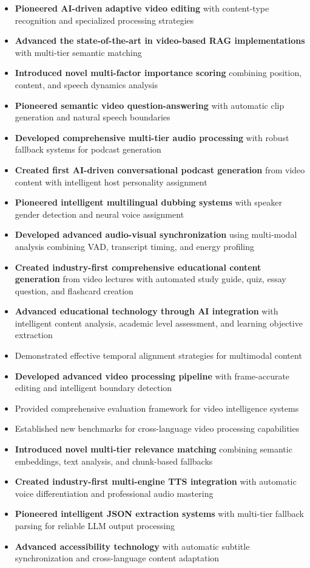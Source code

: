 \documentclass{bscs}
\begin{document}
\begin{itemize}
\item \textbf{Pioneered AI-driven adaptive video editing} with content-type recognition and specialized processing strategies
\item \textbf{Advanced the state-of-the-art in video-based RAG implementations} with multi-tier semantic matching
\item \textbf{Introduced novel multi-factor importance scoring} combining position, content, and speech dynamics analysis
\item \textbf{Pioneered semantic video question-answering} with automatic clip generation and natural speech boundaries
\item \textbf{Developed comprehensive multi-tier audio processing} with robust fallback systems for podcast generation
\item \textbf{Created first AI-driven conversational podcast generation} from video content with intelligent host personality assignment
\item \textbf{Pioneered intelligent multilingual dubbing systems} with speaker gender detection and neural voice assignment
\item \textbf{Developed advanced audio-visual synchronization} using multi-modal analysis combining VAD, transcript timing, and energy profiling
\item \textbf{Created industry-first comprehensive educational content generation} from video lectures with automated study guide, quiz, essay question, and flashcard creation
\item \textbf{Advanced educational technology through AI integration} with intelligent content analysis, academic level assessment, and learning objective extraction
\item Demonstrated effective temporal alignment strategies for multimodal content
\item \textbf{Developed advanced video processing pipeline} with frame-accurate editing and intelligent boundary detection
\item Provided comprehensive evaluation framework for video intelligence systems
\item Established new benchmarks for cross-language video processing capabilities
\item \textbf{Introduced novel multi-tier relevance matching} combining semantic embeddings, text analysis, and chunk-based fallbacks
\item \textbf{Created industry-first multi-engine TTS integration} with automatic voice differentiation and professional audio mastering
\item \textbf{Pioneered intelligent JSON extraction systems} with multi-tier fallback parsing for reliable LLM output processing
\item \textbf{Advanced accessibility technology} with automatic subtitle synchronization and cross-language content adaptation
\end{itemize}
\end{document}
